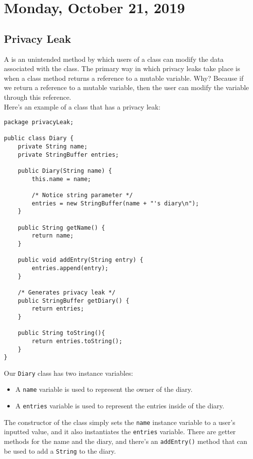 \section{Monday, October 21, 2019}


\subsection{Privacy Leak}

A  is an unintended method by which users of a class can modify the data associated with the class. The primary way in which privacy leaks take place is when a class method returns a reference to a mutable variable. Why? Because if we return a reference to a mutable variable, then the user can modify the variable through this reference. \\

Here's an example of a class that has a privacy leak:

\begin{lstlisting}
package privacyLeak;

public class Diary {
	private String name;
	private StringBuffer entries;

	public Diary(String name) {
		this.name = name;

		/* Notice string parameter */
		entries = new StringBuffer(name + "'s diary\n");
	}

	public String getName() {
		return name;
	}

	public void addEntry(String entry) {
		entries.append(entry);
	}
	
	/* Generates privacy leak */
	public StringBuffer getDiary() {
		return entries;
	}

	public String toString(){
		return entries.toString();
	}
}
\end{lstlisting}

Our \verb!Diary! class has two instance variables: 
\begin{itemize}
    \item A \verb!name! variable is used to represent the owner of the diary.
    \item A \verb!entries! variable is used to represent the entries inside of the diary.
\end{itemize}

The constructor of the class simply sets the \verb!name! instance variable to a user's inputted value, and it also instantiates the \verb!entries! variable. There are getter methods for the name and the diary, and there's an \verb!addEntry()! method that can be used to add a \verb!String! to the diary. \\

